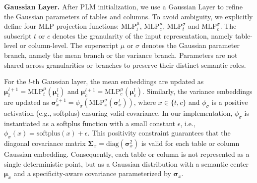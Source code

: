 \noindent\textbf{Gaussian Layer.} 
After PLM initialization, we use a Gaussian Layer to refine the Gaussian parameters of tables and columns. To avoid ambiguity, we explicitly define four MLP projection functions:
\(\mathrm{MLP}_{t}^{\mu}\), $\mathrm{MLP}_{c}^{\mu}$, $\mathrm{MLP}_{t}^{\sigma}$ and $\mathrm{MLP}_{c}^{\sigma}$. 
The subscript \(t\) or \(c\) denotes the granularity of the input representation, namely table-level or column-level. The superscript \(\mu\) or \(\sigma\) denotes the Gaussian parameter branch, namely the mean branch or the variance branch. Parameters are not shared across granularities or branches to preserve their distinct semantic roles.

For the \(l\)-th Gaussian layer, the mean embeddings are updated as \({\mathbf{\mu}}_{t}^{l+1}=\mathrm{MLP}_{t}^{\mu}(\mathbf{\mu}_{t}^{l})\) and \({\mathbf{\mu}}_{c}^{l+1}=\mathrm{MLP}_{c}^{\mu}(\mathbf{\mu}_{c}^{l})\). Similarly, the variance embeddings are updated as \(\mathbf{\sigma}_{x}^{l+1}=\phi_{\sigma}(\mathrm{MLP}_{x}^{\sigma}(\mathbf{\sigma}_{x}^{l}))\), where \(x \in \{t, c\}\) and \(\phi_{\sigma}\) is a positive activation (e.g., softplus) ensuring valid covariance. In our implementation, \(\phi_{\sigma}\) is instantiated as a softplus function with a small constant \(\epsilon\), i.e., \(\phi_{\sigma}(x)=\mathrm{softplus}(x)+\epsilon\). This positivity constraint guarantees that the diagonal covariance matrix \(\mathbf{\Sigma}_x=\mathrm{diag}(\mathbf{\sigma}_x^2)\) is valid for each table or column Gaussian embedding. Consequently, each table or column is not represented as a single deterministic point, but as a Gaussian distribution with a semantic center \(\mathbf{\mu}_x\) and a specificity-aware covariance parameterized by \(\mathbf{\sigma}_x\).



